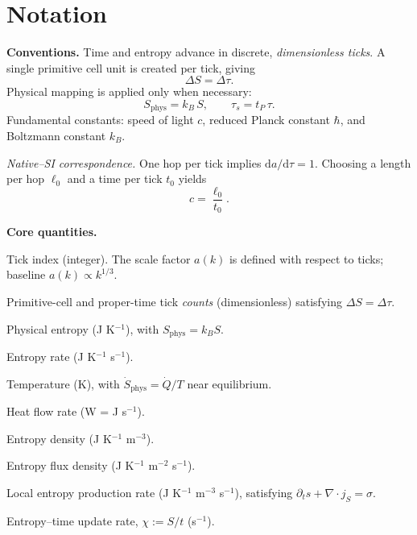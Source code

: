 \section*{Notation}

\noindent\textbf{Conventions.}  
Time and entropy advance in discrete, \emph{dimensionless ticks}.  
A single primitive cell unit is created per tick, giving
\[
  \Delta S = \Delta \tau.
\]
Physical mapping is applied only when necessary:
\[
  S_{\mathrm{phys}} = k_B\,S, \qquad
  \tau_s = t_P\,\tau.
\]
Fundamental constants: speed of light \(c\), reduced Planck constant \(\hbar\), and Boltzmann constant \(k_B\).

\smallskip
\noindent\textit{Native--SI correspondence.}  
One hop per tick implies \(\mathrm{d}a/\mathrm{d}\tau = 1\).  
Choosing a length per hop \(\ell_0\) and a time per tick \(t_0\) yields
\[
  c = \frac{\ell_0}{t_0}.
\]

\bigskip
\noindent\textbf{Core quantities.}
\begin{description}[leftmargin=2.4em,labelsep=0.8em]
  \item[\(k\)] Tick index (integer). The scale factor \(a(k)\) is defined with respect to ticks; baseline \(a(k)\propto k^{1/3}\).
  \item[\(\Delta S,\,\Delta\tau\)] Primitive-cell and proper-time tick \emph{counts} (dimensionless) satisfying \(\Delta S=\Delta\tau\).
  \item[\(S_{\mathrm{phys}}\)] Physical entropy (J K\(^{-1}\)), with \(S_{\mathrm{phys}} = k_B S\).
  \item[\(\dot S_{\mathrm{phys}}\)] Entropy rate (J K\(^{-1}\) s\(^{-1}\)).
  \item[\(T\)] Temperature (K), with \(\dot S_{\mathrm{phys}} = \dot Q / T\) near equilibrium.
  \item[\(\dot Q\)] Heat flow rate (W = J s\(^{-1}\)).
  \item[\(s\)] Entropy density (J K\(^{-1}\) m\(^{-3}\)).
  \item[\(j_S\)] Entropy flux density (J K\(^{-1}\) m\(^{-2}\) s\(^{-1}\)).
  \item[\(\sigma\)] Local entropy production rate (J K\(^{-1}\) m\(^{-3}\) s\(^{-1}\)), satisfying
        \(\partial_t s + \nabla\!\cdot j_S = \sigma.\)
  \item[\(\chi\)] Entropy–time update rate, \(\chi := S/t\) (s\(^{-1}\)).
\end{description}

